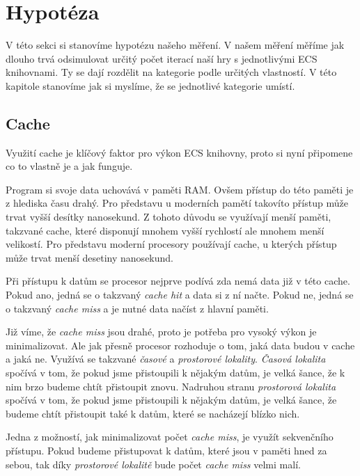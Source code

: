 \section{Hypotéza}
\label{chap:hypothesis}
V této sekci si stanovíme hypotézu našeho měření. V našem měření měříme jak dlouho trvá odsimulovat určitý počet iterací naší hry s jednotlivými ECS knihovnami. Ty se dají rozdělit na kategorie podle určitých vlastností. V této kapitole stanovíme jak si myslíme, že se jednotlivé kategorie umístí.


\subsection{Cache}
Využití cache je klíčový faktor pro výkon ECS knihovny, proto si nyní připomene co to vlastně je a jak funguje.

Program si svoje data uchovává v paměti RAM. Ovšem přístup do této paměti je z hlediska času drahý. Pro představu u moderních pamětí takovíto přístup může trvat vyšší desítky nanosekund. Z tohoto důvodu se využívají menší paměti, takzvané cache, které disponují mnohem vyšší rychlostí ale mnohem menší velikostí. Pro představu moderní procesory používají cache, u kterých přístup může trvat menší desetiny nanosekund.

Při přístupu k datům se procesor nejprve podívá zda nemá data již v této cache. Pokud ano, jedná se o takzvaný \textit{cache hit} a data si z ní načte. Pokud ne, jedná se o takzvaný \textit{cache miss} a je nutné data načíst z hlavní paměti. 

Již víme, že \textit{cache miss} jsou drahé, proto je potřeba pro vysoký výkon je minimalizovat. Ale jak přesně procesor rozhoduje o tom, jaká data budou v cache a jaká ne. Využívá se takzvané \textit{časové} a \textit{prostorové lokality}. \textit{Časová lokalita} spočívá v tom, že pokud jsme přistoupili k nějakým datům, je velká šance, že k nim brzo budeme chtít přistoupit znovu. Nadruhou stranu \textit{prostorová lokalita} spočívá v tom, že pokud jsme přistoupili k nějakým datům, je velká šance, že budeme chtít přistoupit také k datům, které se nacházejí blízko nich.

Jedna z možností, jak minimalizovat počet \textit{cache miss}, je využít sekvenčního přístupu. Pokud budeme přistupovat k datům, které jsou v paměti hned za sebou, tak díky \textit{prostorové lokalitě} bude počet \textit{cache miss} velmi malí.

